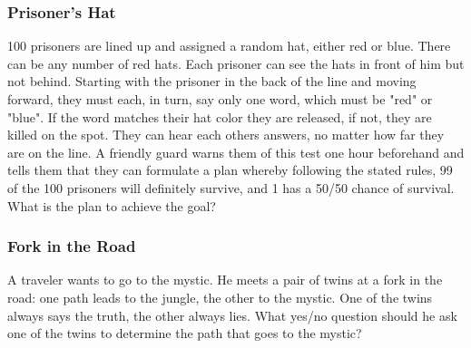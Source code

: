 \documentclass{article}
\begin{document}
\subsubsection{Prisoner's Hat}
100 prisoners are lined up and assigned a random hat, either red or blue. There can be any number of red hats. Each prisoner can see the hats in front of him but not behind. Starting with the prisoner in the back of the line and moving forward, they must each, in turn, say only one word, which must be "red" or "blue". If the word matches their hat color they are released, if not, they are killed on the spot. They can hear each others answers, no matter how far they are on the line. A friendly guard warns them of this test one hour beforehand and tells them that they can formulate a plan whereby following the stated rules, 99 of the 100 prisoners will definitely survive, and 1 has a 50/50 chance of survival. What is the plan to achieve the goal?
\subsubsection{Fork in the Road}
A traveler wants to go to the mystic. He meets a pair of twins at a fork in the road: one path leads to the jungle, the other to the mystic. One of the twins always says the truth, the other always lies. What yes/no question should he ask one of the twins to determine the path that goes to the mystic?
\end{document}
